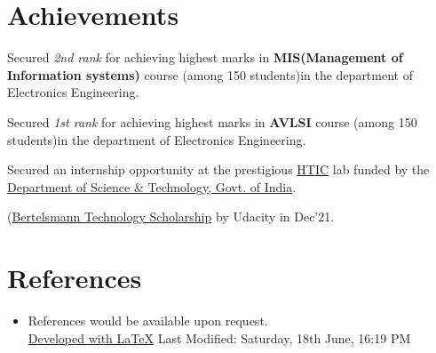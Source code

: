 \documentclass[a4paper,20pt]{article}
\newcommand{\resumeSubHeadingListStart}{\begin{itemize}[leftmargin=*]}
\newcommand{\resumeSubHeadingListEnd}{\end{itemize}}
\begin{document}
\section{Achievements}
\begin{description}[font=$\bullet$]
\item{Secured \textit{2nd rank} for achieving highest marks in \textbf{MIS(Management of Information systems)} course (among 150 students)in the department of Electronics Engineering.}
\item{Secured \textit{1st rank} for achieving highest marks in \textbf{AVLSI} course (among 150 students)in the department of Electronics Engineering.}
\item{Secured an internship opportunity at the prestigious \href{http://hticlab.org/htic/}{HTIC} lab funded by the \href{https://dst.gov.in/}{Department of Science \& Technology, Govt. of India}.}
\item(\href{https://www.udacity.com/bertelsmann-tech-scholarships}{Bertelsmann Technology Scholarship} by Udacity in Dec'21.

\end{description}
\vspace{2pt}

\section{References}
  \resumeSubHeadingListStart
   \item References would be available upon request.\\
   \vspace{490 pt}
   {\href{}{Developed with \LaTeX}} \hspace{205pt}
   {Last Modified: Saturday, 18th June, 16:19 PM}
  \resumeSubHeadingListEnd
\end{document}

